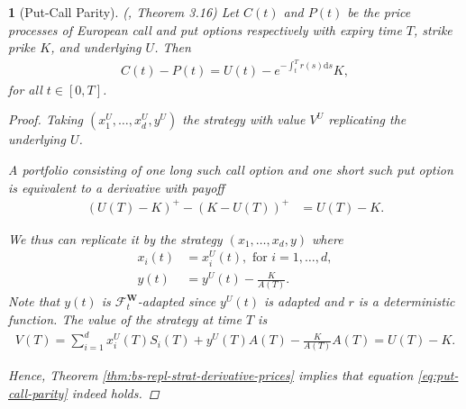 \documentclass[english]{article}
\numberwithin{equation}{section}
\numberwithin{figure}{section}
\theoremstyle{bolddescit}
\newtheorem{theorem}{\protect\theoremname}[section]
\theoremstyle{definition}
\theoremstyle{definition}
\theoremstyle{plain}
\theoremstyle{plain}
\theoremstyle{bolddesc}
\theoremstyle{plain}
\theoremstyle{remark}
\providecommand{\theoremname}{Theorem}
\begin{document}
\begin{theorem}[Put-Call Parity]\label{thm:put-call-parity}
  (\cite{capinski_blackscholes_2012}, Theorem 3.16)
  Let $C(t)$ and $P(t)$ be the price processes of European call and put options respectively with expiry time $T$, strike prike $K$, and underlying $U$. Then
  \begin{align}\label{eq:put-call-parity}
    C(t) - P(t) = U(t) - e^{-\int_t^T r(s) \mathrm{d}s} K,
  \end{align}
  for all $t \in [0,T]$.

  \begin{proof}
    Taking $(x_1^U,\ldots,x_d^U,y^U)$ the strategy with value $V^U$ replicating the underlying $U$.

    A portfolio consisting of one long such call option and one short such put option is equivalent to a derivative with payoff
    \begin{align*}
      (U(T) - K)^+ - (K - U(T))^+
      &= U(T) - K.
    \end{align*}

    We thus can replicate it by the strategy $(x_1,\ldots,x_d,y)$ where
    \begin{align*}
      x_i(t) &= x_i^U(t), \text{ for } i=1,\ldots,d,\\
      y(t) &= y^U(t) - \frac{K}{A(T)}.
    \end{align*}
    Note that $y(t)$ is $\mathcal{F}^\mathbf{W}_t$-adapted since $y^U(t)$ is adapted and $r$ is a deterministic function. The value of the strategy at time $T$ is
    \begin{align*}
      V(T) = \sum_{i=1}^d x_i^U(T) S_i(T) + y^U(T) A(T) - \frac{K}{A(T)} A(T)
      = U(T) - K.
    \end{align*}

    Hence, Theorem \ref{thm:bs-repl-strat-derivative-prices} implies that equation \eqref{eq:put-call-parity} indeed holds.
  \end{proof}
\end{theorem}
\end{document}
